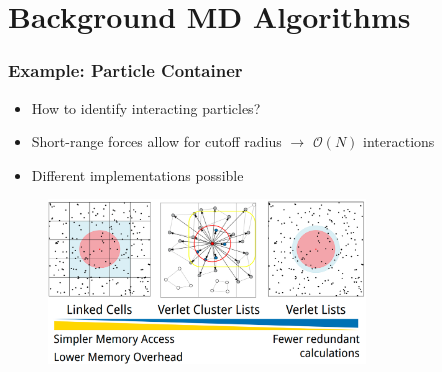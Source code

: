 \documentclass[
	10pt,
	t		%
]{beamer}
\begin{document}
\section{Background MD Algorithms}

\begin{frame}
    \frametitle{Example: Particle Container}

    \begin{itemize}
        \item How to identify interacting particles?
        \item Short-range forces allow for cutoff radius $\rightarrow$ $\mathcal{O}(N)$ interactions
        \item Different implementations possible
    \end{itemize}

    \vspace{0.2cm}
    \begin{figure}
        \centering
        \includegraphics[width=0.75\textwidth]{figures/particle_containers.png}
        \caption{\small{
                \cite{SIAM_PP24}}}
    \end{figure}

\end{frame}
\end{document}
